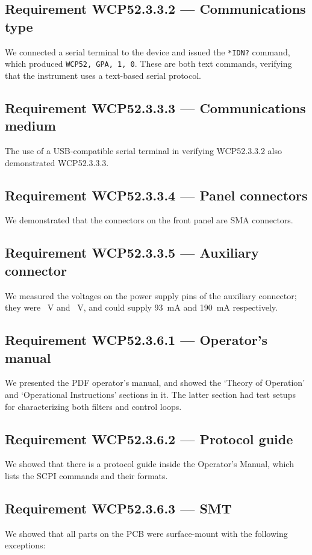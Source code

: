 \subsection*{Requirement WCP52.3.3.2 --- Communications type}
We connected a serial terminal to the device and issued the \texttt{*IDN?} command,
which produced \texttt{WCP52,~GPA,~1,~0}. These are both text commands, verifying that the
instrument uses a text-based serial protocol.

\subsection*{Requirement WCP52.3.3.3 --- Communications medium}
The use of a USB-compatible serial terminal in verifying WCP52.3.3.2 also demonstrated
WCP52.3.3.3.

\subsection*{Requirement WCP52.3.3.4 --- Panel connectors}
We demonstrated that the connectors on the front panel are SMA connectors.

\subsection*{Requirement WCP52.3.3.5 --- Auxiliary connector}
We measured the voltages on the power supply pins of the auxiliary connector; they were
~V and ~V, and could supply 93~mA and 190~mA respectively.

\subsection*{Requirement WCP52.3.6.1 --- Operator's manual}
We presented the PDF operator's manual, and showed the `Theory of Operation' and `Operational
Instructions' sections in it. The latter section had test setups for characterizing both
filters and control loops.

\subsection*{Requirement WCP52.3.6.2 --- Protocol guide}
We showed that there is a protocol guide inside the Operator's Manual, which lists the
SCPI commands and their formats.

\subsection*{Requirement WCP52.3.6.3 --- SMT}
We showed that all parts on the PCB were surface-mount with the following exceptions:

